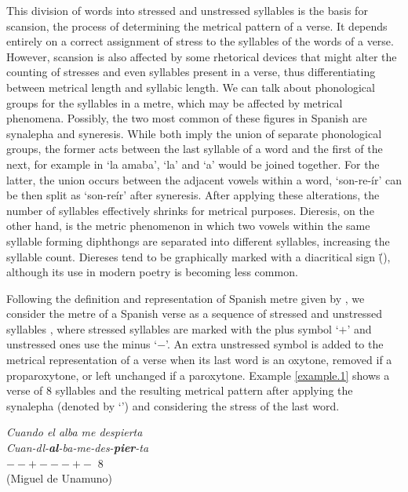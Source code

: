 \documentclass[a4paper,11pt,twocolumn,twoside]{article}
\begin{document}
This division of words into stressed and unstressed syllables is the basis for scansion, the process of determining the metrical pattern of a verse. It depends entirely on a correct assignment of stress to the syllables of the words of a verse. However, scansion is also affected by some rhetorical devices that might alter the counting of stresses and even syllables present in a verse, thus differentiating between metrical length and syllabic length. We can talk about phonological groups for the syllables in a metre, which may be affected by metrical phenomena. Possibly, the two most common of these figures in Spanish are synalepha and syneresis. While both imply the union of separate phonological groups, the former acts between the last syllable of a word and the first of the next, for example in `la amaba', `la' and `a' would be joined together. For the latter, the union occurs between the adjacent vowels within a word, `son-re-ír' can be then split as `son-reír' after syneresis. After applying these alterations, the number of syllables effectively shrinks for metrical purposes. Dieresis, on the other hand, is the metric phenomenon in which two vowels within the same syllable forming diphthongs are separated into different syllables, increasing the syllable count. Diereses tend to be graphically marked with a diacritical sign (\"{ }), although its use in modern poetry is becoming less common.  %

Following the definition and representation of Spanish metre given by , we consider the metre of a Spanish verse as a sequence of stressed and unstressed syllables \cite{quilis1969metrica,navarro1991metrica,caparros1993metrica}, where stressed syllables are marked with the plus symbol `$+$' and unstressed ones use the minus `$-$'. An extra unstressed symbol is added to the metrical representation of a verse when its last word is an oxytone, removed if a proparoxytone, or left unchanged if a paroxytone. Example \ref{example.1} shows a verse of 8 syllables and the resulting metrical pattern after applying the synalepha (denoted by `\textbottomtiebar{ }') and considering the stress of the last word.

\begin{example}\label{example.1}
\textit{Cuando el alba me despierta} \\
\textit{Cuan-dl-\textbf{al}-ba-me-des-\textbf{pier}-ta} \\
$--+---+-$ 8 \\
(Miguel de Unamuno)
\end{example}
\end{document}
